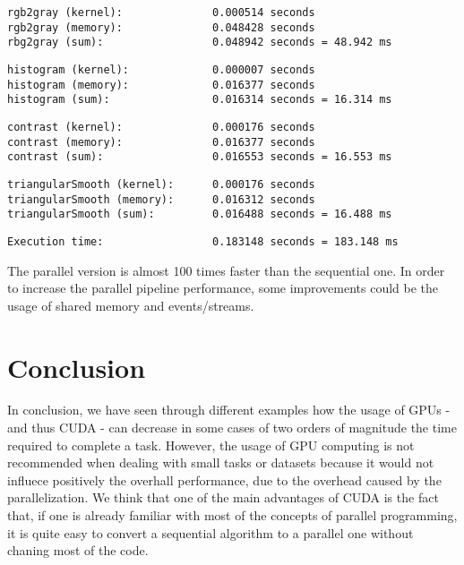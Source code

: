 \documentclass[a4paper]{article}
\begin{document}
\begin{verbatim}
rgb2gray (kernel):              0.000514 seconds
rgb2gray (memory):              0.048428 seconds
rbg2gray (sum):                 0.048942 seconds = 48.942 ms
\end{verbatim}
\begin{verbatim}
histogram (kernel):             0.000007 seconds
histogram (memory):             0.016377 seconds
histogram (sum):                0.016314 seconds = 16.314 ms
\end{verbatim}
\begin{verbatim}
contrast (kernel):              0.000176 seconds
contrast (memory):              0.016377 seconds
contrast (sum):                 0.016553 seconds = 16.553 ms
\end{verbatim}
\begin{verbatim}
triangularSmooth (kernel):      0.000176 seconds
triangularSmooth (memory):      0.016312 seconds
triangularSmooth (sum):         0.016488 seconds = 16.488 ms
\end{verbatim}
\begin{verbatim}
Execution time:                 0.183148 seconds = 183.148 ms
\end{verbatim}

The parallel version is almost 100 times faster than the sequential one. In order to increase the parallel pipeline performance, some improvements could be the usage of shared memory and events/streams.

\section{Conclusion}

In conclusion, we have seen through different examples how the usage of GPUs - and thus CUDA - can decrease in some cases of two orders of magnitude the time required to complete a task. However, the usage of GPU computing is not recommended when dealing with small tasks or datasets because it would not influece positively the overhall performance, due to the overhead caused by the parallelization. We think that one of the main advantages of CUDA is the fact that, if one is already familiar with most of the concepts of parallel programming, it is quite easy to convert a sequential algorithm to a parallel one without chaning most of the code.
\end{document}
